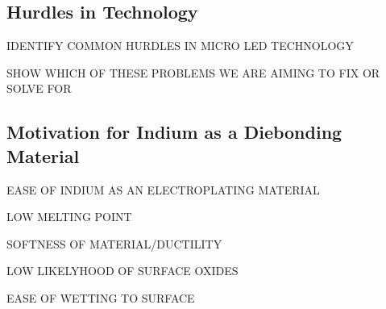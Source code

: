 \subsection{Hurdles in \uled Technology}

IDENTIFY COMMON HURDLES IN MICRO LED TECHNOLOGY

SHOW WHICH OF THESE PROBLEMS WE ARE AIMING TO FIX OR SOLVE FOR


\subsection{Motivation for Indium as a Diebonding Material}

EASE OF INDIUM AS AN ELECTROPLATING MATERIAL

LOW MELTING POINT

SOFTNESS OF MATERIAL/DUCTILITY

LOW LIKELYHOOD OF SURFACE OXIDES

EASE OF WETTING TO SURFACE
